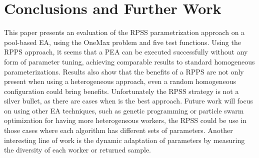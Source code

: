 \documentclass{llncs}
\begin{document}
\section{Conclusions and Further Work}
\label{sec:conclusions}
This paper presents an evaluation of the RPSS parametrization approach on 
a pool-based EA, using the OneMax problem and five test functions. 
Using the RPPS approach, it seems that a PEA can be executed successfully 
without any form of parameter tuning, achieving comparable results to standard homogeneous
parameterizations. Results also show that the benefits of a RPPS are not only present
when using a heterogeneous approach, even a random homogeneous configuration could bring
benefits. Unfortunately the RPSS strategy is not a silver bullet, as there are cases
when is the best approach. Future work will focus on using other EA techniques, 
such as genetic programming or particle swarm optimization for having more heterogeneous
workers, the RPSS could be use in those cases where each algorithm has different sets of
parameters. Another interesting line of work is the dynamic adaptation of parameters by
measuring the diversity of each worker or returned sample.   




\end{document}
